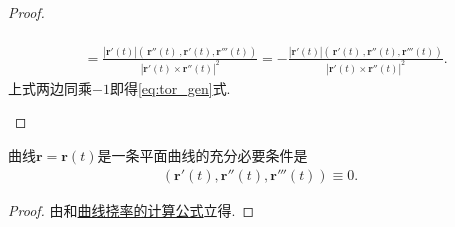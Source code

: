 \documentclass[../../main.tex]{subfiles}%
\begin{document}
\begin{proof}
\begin{enumerate}
\begin{align*}
\\
&=\frac{\left| \boldsymbol{r}' \left( t \right) \right|\left( \,\boldsymbol{r}'' \left( t \right) \,,\boldsymbol{r}' \left( t \right) ,\boldsymbol{r}''' \left( t \right) \right)}{\left| \boldsymbol{r}' \left( t \right) \times \boldsymbol{r}'' \left( t \right) \right|^2}=-\frac{\left| \boldsymbol{r}' \left( t \right) \right|\left( \,\boldsymbol{r}' \left( t \right) \,,\boldsymbol{r}'' \left( t \right) ,\boldsymbol{r}''' \left( t \right) \right)}{\left| \boldsymbol{r}' \left( t \right) \times \boldsymbol{r}'' \left( t \right) \right|^2}.
\end{align*}
上式两边同乘$-1$即得\eqref{eq:tor_gen}式.
\end{enumerate}
\end{proof}

\begin{theorem}
曲线$\bm{r} = \bm{r}(t)$是一条平面曲线的充分必要条件是
\begin{align*}
(\bm{r}'(t), \bm{r}''(t), \bm{r}'''(t)) \equiv 0.
\end{align*}
\end{theorem}
\begin{proof}
由和\hyperref[theorem:微分几何-曲线挠率的计算公式]{曲线挠率的计算公式}立得.
\end{proof}
\end{document}
